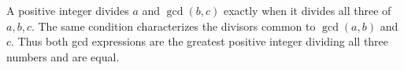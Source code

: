A positive integer divides $a$ and $\gcd(b,c)$ exactly when it divides all three of $a,b,c$. The same condition characterizes the divisors common to $\gcd(a,b)$ and $c$. Thus both gcd expressions are the greatest positive integer dividing all three numbers and are equal.
